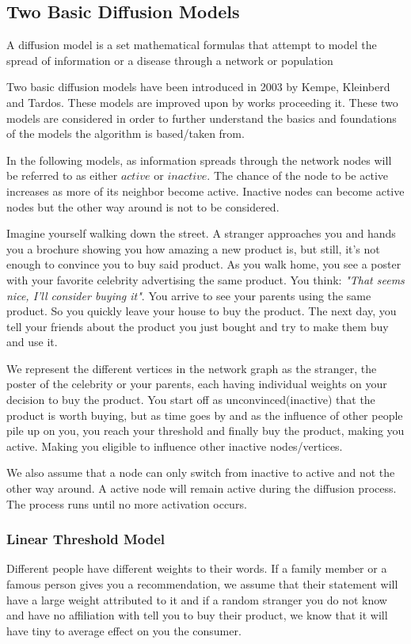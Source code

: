 \subsection{Two Basic Diffusion Models}
A diffusion model is a set mathematical formulas that attempt to model the spread of information or a disease through a network or population

Two basic diffusion models have been introduced in 2003 by Kempe, Kleinberd and Tardos.\cite{Kempe} These models are improved upon by works proceeding it. These two models are considered in order to further understand the basics and foundations of the models the algorithm is based/taken from.


In the following models, as information spreads through the network nodes will be referred to as either $active$ or $inactive$. The chance of the node to be active increases as more of its neighbor become active. Inactive nodes can become active nodes but the other way around is not to be considered. 

Imagine yourself walking down the street. A stranger approaches you and hands you a brochure showing you how amazing a new product is, but still, it's not enough to convince you to buy said product. As you walk home, you see a poster with your favorite celebrity advertising the same product. You think: \textit{"That seems nice, I'll consider buying it"}. You arrive to see your parents using the same product. So you quickly leave your house to buy the product. The next day, you tell your friends about the product you just bought and try to make them buy and use it.

We represent the different vertices in the network graph as the stranger, the poster of the celebrity or your parents, each having individual weights on your decision to buy the product. You start off as unconvinced(inactive) that the product is worth buying, but as time goes by and as the influence of other people pile up on you, you reach your threshold and finally buy the product, making you active. Making you eligible to influence other inactive nodes/vertices.

We also assume that a node can only switch from inactive to active and not the other way around. A active node will remain active during the diffusion process. The process runs until no more activation occurs.\cite{Shakarian:2012:LSN:2456719.2457081} 
\subsubsection{Linear Threshold Model}
Different people have different weights to their words. If a family member or a famous person gives you a recommendation, we assume that their statement will have a large weight attributed to it and if a random stranger you do not know and have no affiliation with tell you to buy their product, we know that it will have tiny to average effect on you the consumer.

